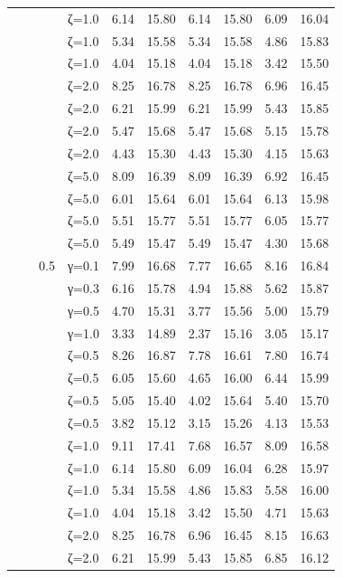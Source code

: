 \begin{table}[htbp]
\begin{tabular}{ll r l  rr  rr  rr}
  &  &  & ζ=1.0 & 6.14 & 15.80 & 6.14 & 15.80 & 6.09 & 16.04 \\
  &  &  & ζ=1.0 & 5.34 & 15.58 & 5.34 & 15.58 & 4.86 & 15.83 \\
  &  &  & ζ=1.0 & 4.04 & 15.18 & 4.04 & 15.18 & 3.42 & 15.50 \\
  &  &  & ζ=2.0 & 8.25 & 16.78 & 8.25 & 16.78 & 6.96 & 16.45 \\
  &  &  & ζ=2.0 & 6.21 & 15.99 & 6.21 & 15.99 & 5.43 & 15.85 \\
  &  &  & ζ=2.0 & 5.47 & 15.68 & 5.47 & 15.68 & 5.15 & 15.78 \\
  &  &  & ζ=2.0 & 4.43 & 15.30 & 4.43 & 15.30 & 4.15 & 15.63 \\
  &  &  & ζ=5.0 & 8.09 & 16.39 & 8.09 & 16.39 & 6.92 & 16.45 \\
  &  &  & ζ=5.0 & 6.01 & 15.64 & 6.01 & 15.64 & 6.13 & 15.98 \\
  &  &  & ζ=5.0 & 5.51 & 15.77 & 5.51 & 15.77 & 6.05 & 15.77 \\
  &  &  & ζ=5.0 & 5.49 & 15.47 & 5.49 & 15.47 & 4.30 & 15.68 \\
  &  & 0.5 & γ=0.1 & 7.99 & 16.68 & 7.77 & 16.65 & 8.16 & 16.84 \\
  &  &  & γ=0.3 & 6.16 & 15.78 & 4.94 & 15.88 & 5.62 & 15.87 \\
  &  &  & γ=0.5 & 4.70 & 15.31 & 3.77 & 15.56 & 5.00 & 15.79 \\
  &  &  & γ=1.0 & 3.33 & 14.89 & 2.37 & 15.16 & 3.05 & 15.17 \\
  &  &  & ζ=0.5 & 8.26 & 16.87 & 7.78 & 16.61 & 7.80 & 16.74 \\
  &  &  & ζ=0.5 & 6.05 & 15.60 & 4.65 & 16.00 & 6.44 & 15.99 \\
  &  &  & ζ=0.5 & 5.05 & 15.40 & 4.02 & 15.64 & 5.40 & 15.70 \\
  &  &  & ζ=0.5 & 3.82 & 15.12 & 3.15 & 15.26 & 4.13 & 15.53 \\
  &  &  & ζ=1.0 & 9.11 & 17.41 & 7.68 & 16.57 & 8.09 & 16.58 \\
  &  &  & ζ=1.0 & 6.14 & 15.80 & 6.09 & 16.04 & 6.28 & 15.97 \\
  &  &  & ζ=1.0 & 5.34 & 15.58 & 4.86 & 15.83 & 5.58 & 16.00 \\
  &  &  & ζ=1.0 & 4.04 & 15.18 & 3.42 & 15.50 & 4.71 & 15.63 \\
  &  &  & ζ=2.0 & 8.25 & 16.78 & 6.96 & 16.45 & 8.15 & 16.63 \\
  &  &  & ζ=2.0 & 6.21 & 15.99 & 5.43 & 15.85 & 6.85 & 16.12 \\

\end{tabular}
\end{table}
